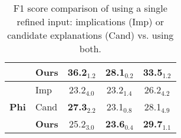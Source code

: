 \begin{table}[h]
\begin{tabular}{ll|ccc}
 & \textbf{Ours}  & 
 36.2$_{1.2}$ & 
 28.1$_{0.2}$ & 
 33.5$_{1.2}$\\ \midrule
 
\multirow{3}{*}{\textbf{Phi}} & 
 Imp  & 
 23.2$_{4.0}$ & 
 23.2$_{1.4}$ & 
 26.2$_{4.2}$\\ 
 
 & Cand  & 
 \textbf{27.3}$_{2.2}$ & 
 23.1$_{0.8}$ & 
 28.1$_{4.9}$\\ 
 
 & \textbf{Ours}  & 
 25.2$_{3.0}$ & 
 \textbf{23.6}$_{0.4}$ & 
 \textbf{29.7}$_{1.1}$\\ \bottomrule

\end{tabular}
\caption{F1 score comparison of using a single refined input: implications (Imp) or candidate explanations (Cand) vs. using both.}
\vspace{-10pt}
\label{tab:ablation}
\end{table}
 
 
 
